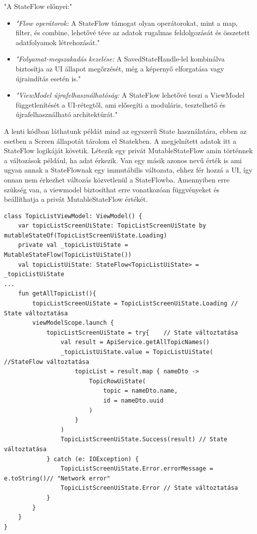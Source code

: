 "A StateFlow előnyei:"\cite{StateVsStateFlow}
\begin{itemize}
    \item \emph{"Flow operátorok:} A StateFlow támogat olyan operátorokat, mint a map, filter, és combine, lehetővé téve az adatok rugalmas feldolgozását és összetett adatfolyamok létrehozását."
    \item \emph{"Folyamat-megszakadás kezelése:} A SavedStateHandle-lel kombinálva biztosítja az UI állapot megőrzését, még a képernyő elforgatása vagy újraindítás esetén is."
    \item \emph{"ViewModel újrafelhasználhatóság:} A StateFlow lehetővé teszi a ViewModel függetlenítését a UI-rétegtől, ami elősegíti a moduláris, tesztelhető és újrafelhasználható architektúrát."
\end{itemize}

A lenti kódban láthatunk példát mind az egyszerű State használatára, ebben az esetben a Screen állapotát tárolom el Statekben.
A megjelnített adatok itt a StateFlow logikáját követik. 
Létezik egy privát MutableStateFlow amin történnek a változások például, ha adat érkezik.
Van egy másik azonos nevű érték is ami ugyan annak a StateFlownak egy immutábilis változata, ehhez fér hozzá a UI, így onnan nem érkezhet változás közvetlenül a StateFlowba.
Amennyiben erre szükség van, a viewmodel biztosíthat erre vonatkozóan függvényeket és beállíthatja a privát MutableStateFlow értékét.

\begin{lstlisting}
class TopicListViewModel: ViewModel() {
    var topicListScreenUiState: TopicListScreenUiState by mutableStateOf(TopicListScreenUiState.Loading)
    private val _topicListUiState = MutableStateFlow(TopicListUiState())
    val topicListUiState: StateFlow<TopicListUiState> = _topicListUiState
...
    fun getAllTopicList(){
        topicListScreenUiState = TopicListScreenUiState.Loading // State változtatása
        viewModelScope.launch {
            topicListScreenUiState = try{    // State változtatása
                val result = ApiService.getAllTopicNames()
                _topicListUiState.value = TopicListUiState(     //StateFlow változtatása
                    topicList = result.map { nameDto ->
                        TopicRowUiState(
                            topic = nameDto.name,
                            id = nameDto.uuid
                        )
                    }
                )
                TopicListScreenUiState.Success(result) // State változtatása
            } catch (e: IOException) {
                TopicListScreenUiState.Error.errorMessage = e.toString()// "Network error"
                TopicListScreenUiState.Error // State változtatása
            }
        }
    }
}
\end{lstlisting}

